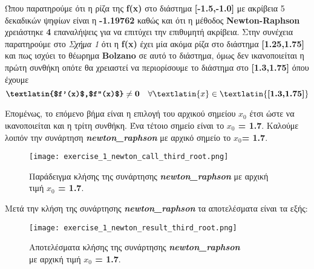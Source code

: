 \documentclass[First Project.tex]{subfiles}
\begin{document}
Ώπου παρατηρούμε ότι η ρίζα της \textlatin{\textbf{f(x)}} στο διάστημα \textlatin{\textbf{[-1.5,-1.0]}} με ακρίβεια 5 δεκαδικών ψηφίων 
είναι η \textbf{-1.19762} καθώς και ότι η μέθοδος \textlatin{\textbf{Newton-Raphson}} χρειάστηκε \textbf{4} επαναλήψεις για να επιτύχει την επιθυμητή ακρίβεια.
Στην συνέχεια παρατηρούμε στο \textit{Σχήμα 1} ότι η \textlatin{\textbf{f(x)}} έχει μία ακόμα ρίζα στο διάστημα \textlatin{\textbf{[1.25,1.75]}} και
πως ισχύει το θέωρημα \textlatin{\textbf{Bolzano}} σε αυτό το διάστημα, όμως δεν ικανοποιείται η πρώτη συνθήκη οπότε θα χρειαστεί να 
περιορίσουμε το διάστημα στο \textlatin{\textbf{[1.3,1.75]}} όπου έχουμε 
\begin{equation*}
    \textbf{\textlatin{$f'(x)$,$f''(x)$}} \neq \textbf{0} \quad \forall \textlatin{x} \in \textlatin{\textbf{[1.3,1.75]}}
\end{equation*}

Επομένως, το επόμενο βήμα είναι η επιλογή του αρχικού σημείου \textbf{\textlatin{$x_{0}$}} έτσι ώστε να ικανοποιείται και η τρίτη συνθήκη.
Ένα τέτοιο σημείο είναι το \textbf{\textlatin{$x_{0}$ = 1.7}}.
Καλούμε λοιπόν την συνάρτηση \textit{\textlatin{\textbf{newton\_raphson}}} με αρχικό σημείο το \textlatin{\textbf{$x_{0}$= 1.7}}.
\vspace{5px}
\begin{figure}[hp]
    \centering
    \captionsetup{justification=centering}
    \begin{center}
        \texttt{[image: exercise\_1\_newton\_call\_third\_root.png]}    
        \caption{Παράδειγμα κλήσης της συνάρτησης \textit{\textlatin{\textbf{newton\_raphson}}} με αρχική τιμή \textbf{\textlatin{$x_{0}$ = 1.7}}.}
    \end{center}
\end{figure}


Μετά την κλήση της συνάρτησης \textit{\textlatin{\textbf{newton\_raphson}}} τα αποτελέσματα είναι τα εξής:
\vspace{5px}
\begin{figure}[hp]
    \centering
    \captionsetup{justification=centering}
    \begin{center}
    \texttt{[image: exercise\_1\_newton\_result\_third\_root.png]}    
    \caption{ Αποτελέσματα κλήσης της συνάρτησης \textit{\textlatin{\textbf{newton\_raphson}}} \\ με αρχική τιμή \textbf{\textlatin{$x_{0}$ = 1.7}}. }
    \end{center}
\end{figure}
\end{document}
